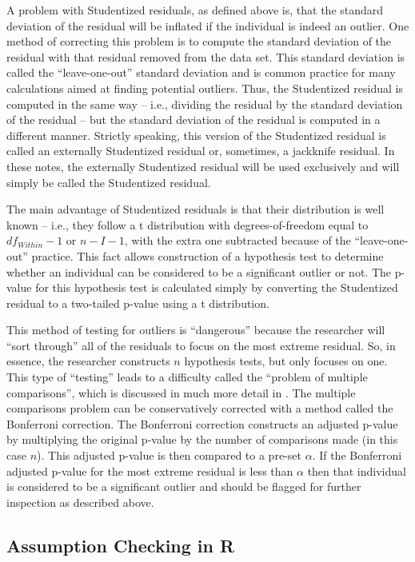 \documentclass[10pt,openany]{book}\usepackage[]{graphicx}\usepackage[]{color}
\begin{document}
A problem with Studentized residuals, as defined above is, that the standard deviation of the residual will be inflated if the individual is indeed an outlier.  One method of correcting this problem is to compute the standard deviation of the residual with that residual removed from the data set.  This standard deviation is called the ``leave-one-out'' standard deviation and is common practice for many calculations aimed at finding potential outliers.  Thus, the Studentized residual is computed in the same way -- i.e., dividing the residual by the standard deviation of the residual -- but the standard deviation of the residual is computed in a different manner.  Strictly speaking, this version of the Studentized residual is called an externally Studentized residual or, sometimes, a jackknife residual.  In these notes, the externally Studentized residual will be used exclusively and will simply be called the Studentized residual.

The main advantage of Studentized residuals is that their distribution is well known -- i.e., they follow a t distribution with degrees-of-freedom equal to $df_{Within}-1$ or $n-I-1$, with the extra one subtracted because of the ``leave-one-out'' practice.  This fact allows construction of a hypothesis test to determine whether an individual can be considered to be a significant outlier or not.  The p-value for this hypothesis test is calculated simply by converting the Studentized residual to a two-tailed p-value using a t distribution.

This method of testing for outliers is ``dangerous'' because the researcher will ``sort through'' all of the residuals to focus on the most extreme residual.  So, in essence, the researcher constructs $n$ hypothesis tests, but only focuses on one.  This type of ``testing'' leads to a difficulty called the ``problem of multiple comparisons'', which is discussed in much more detail in .  The multiple comparisons problem can be conservatively corrected with a method called the Bonferroni correction.  The Bonferroni correction constructs an adjusted p-value by multiplying the original p-value by the number of comparisons made (in this case $n$).  This adjusted p-value is then compared to a pre-set $\alpha$.  If the Bonferroni adjusted p-value for the most extreme residual is less than $\alpha$ then that individual is considered to be a significant outlier and should be flagged for further inspection as described above.


\subsection{Assumption Checking in R}
\end{document}
